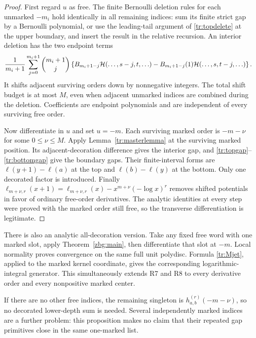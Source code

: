 \begin{proof}
First regard $u$ as free. The finite Bernoulli deletion rules for each
unmarked $-m_i$ hold identically in all remaining indices: sum its
finite strict gap by a Bernoulli polynomial, or use the leading-tail
argument of \eqref{tr:topdelete} at the upper boundary, and insert the
result in the relative recursion. An interior deletion has the two
endpoint terms
\[
 \frac1{m_i+1}\sum_{j=0}^{m_i+1}\binom{m_i+1}{j}
 \left\{B_{m_i+1-j}\mathcal H(\ldots,s-j,t,\ldots)
       -B_{m_i+1-j}(1)\mathcal H(\ldots,s,t-j,\ldots)\right\}.
\]
It shifts adjacent surviving orders down by nonnegative integers.
The total shift budget is at most $M$, even when adjacent unmarked
indices are combined during the deletion. Coefficients are endpoint
polynomials and are independent of every surviving free order.

Now differentiate in $u$ and set $u=-m$. Each surviving marked order
is $-m-\nu$ for some $0\leq\nu\leq M$.
Apply Lemma~\ref{tr:masterlemma} at the surviving marked position.
Its adjacent-decoration difference gives the interior gap, and
\eqref{tr:topgap}--\eqref{tr:bottomgap} give the boundary gaps.
Their finite-interval forms are
$\ell(y+1)-\ell(a)$ at the top and
$\ell(b)-\ell(y)$ at the bottom. Only one decorated factor is introduced.
Finally
$\ell_{m+\nu,r}(x+1)=\ell_{m+\nu,r}(x)
                   -x^{m+\nu}(-\log x)^r$
removes shifted potentials in favor of ordinary free-order derivatives.
The analytic identities at every step were proved with the marked
order still free, so the transverse differentiation is legitimate.
\end{proof}

There is also an analytic all-decoration version. Take any fixed
free word with one marked slot, apply Theorem~\ref{zbg:main}, then
differentiate that slot at $-m$. Local normality proves convergence on
the same full unit polydisc. Formula \eqref{tr:Mjet}, applied to the
marked kernel coordinate, gives the corresponding logarithmic-integral
generator. This simultaneously extends R7 and R8 to every derivative
order and every nonpositive marked center.

If there are no other free indices, the remaining singleton is
$h_{a,b}^{(r)}(-m-\nu)$, so no decorated lower-depth sum is needed.
Several independently marked indices are a further problem: this
proposition makes no claim that their repeated gap primitives close
in the same one-marked list.

